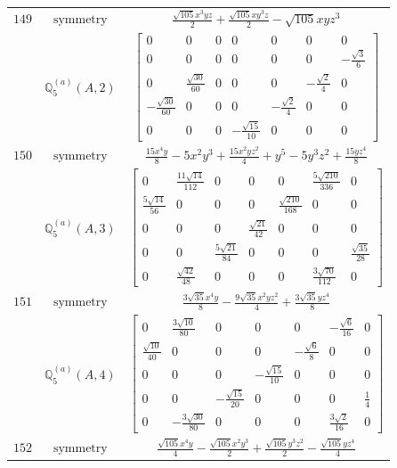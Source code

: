 \documentclass[fleqn,8pt,landscape]{jsarticle}
\begin{document}
\begin{longtable}{ccc}
$ 149 $ & $ \text{symmetry} $ & $ \frac{\sqrt{105} x^{3} y z}{2} + \frac{\sqrt{105} x y^{3} z}{2} - \sqrt{105} x y z^{3} $ \\
$  $ & $ \mathbb{Q}_{5}^{(a)}(A,2) $ & $ \begin{bmatrix} 0 & 0 & 0 & 0 & 0 & 0 & 0 \\ 0 & 0 & 0 & 0 & 0 & 0 & - \frac{\sqrt{3}}{6} \\ 0 & \frac{\sqrt{30}}{60} & 0 & 0 & 0 & - \frac{\sqrt{2}}{4} & 0 \\ - \frac{\sqrt{30}}{60} & 0 & 0 & 0 & - \frac{\sqrt{2}}{4} & 0 & 0 \\ 0 & 0 & 0 & - \frac{\sqrt{15}}{10} & 0 & 0 & 0 \end{bmatrix} $ \\ \hline
$ 150 $ & $ \text{symmetry} $ & $ \frac{15 x^{4} y}{8} - 5 x^{2} y^{3} + \frac{15 x^{2} y z^{2}}{4} + y^{5} - 5 y^{3} z^{2} + \frac{15 y z^{4}}{8} $ \\
$  $ & $ \mathbb{Q}_{5}^{(a)}(A,3) $ & $ \begin{bmatrix} 0 & \frac{11 \sqrt{14}}{112} & 0 & 0 & 0 & \frac{5 \sqrt{210}}{336} & 0 \\ \frac{5 \sqrt{14}}{56} & 0 & 0 & 0 & \frac{\sqrt{210}}{168} & 0 & 0 \\ 0 & 0 & 0 & \frac{\sqrt{21}}{42} & 0 & 0 & 0 \\ 0 & 0 & \frac{5 \sqrt{21}}{84} & 0 & 0 & 0 & \frac{\sqrt{35}}{28} \\ 0 & \frac{\sqrt{42}}{48} & 0 & 0 & 0 & \frac{3 \sqrt{70}}{112} & 0 \end{bmatrix} $ \\ \hline
$ 151 $ & $ \text{symmetry} $ & $ \frac{3 \sqrt{35} x^{4} y}{8} - \frac{9 \sqrt{35} x^{2} y z^{2}}{4} + \frac{3 \sqrt{35} y z^{4}}{8} $ \\
$  $ & $ \mathbb{Q}_{5}^{(a)}(A,4) $ & $ \begin{bmatrix} 0 & \frac{3 \sqrt{10}}{80} & 0 & 0 & 0 & - \frac{\sqrt{6}}{16} & 0 \\ \frac{\sqrt{10}}{40} & 0 & 0 & 0 & - \frac{\sqrt{6}}{8} & 0 & 0 \\ 0 & 0 & 0 & - \frac{\sqrt{15}}{10} & 0 & 0 & 0 \\ 0 & 0 & - \frac{\sqrt{15}}{20} & 0 & 0 & 0 & \frac{1}{4} \\ 0 & - \frac{3 \sqrt{30}}{80} & 0 & 0 & 0 & \frac{3 \sqrt{2}}{16} & 0 \end{bmatrix} $ \\ \hline
$ 152 $ & $ \text{symmetry} $ & $ \frac{\sqrt{105} x^{4} y}{4} - \frac{\sqrt{105} x^{2} y^{3}}{2} + \frac{\sqrt{105} y^{3} z^{2}}{2} - \frac{\sqrt{105} y z^{4}}{4} $ \\

\end{longtable}
\end{document}
